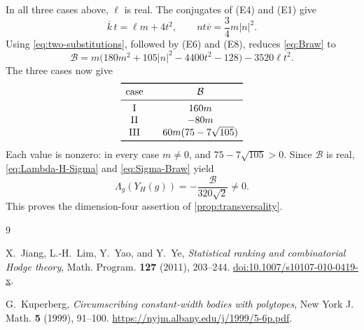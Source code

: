 \documentclass[11pt,reqno]{amsart}
\theoremstyle{remark}
\newcommand{\abs}[1]{\left\lvert #1\right\rvert}
\begin{document}
In all three cases above, $\ell$ is real.  The conjugates of (E4) and (E1)
give
\begin{equation}\label{eq:two-substitutions}
\overline k\,t=\ell m+4t^2,
\qquad
nt\overline v=\frac34m\abs n^2.
\end{equation}
Using \eqref{eq:two-substitutions}, followed by (E6) and (E8), reduces
\eqref{eq:Braw} to
\begin{equation}\label{eq:B-simplified}
\mathcal B
=m\bigl(180m^2+105\abs n^2-4400t^2-128\bigr)
-3520\ell t^2.
\end{equation}
The three cases now give
\begin{equation}\label{eq:B-values}
\begin{array}{c@{\qquad}c}
\toprule
\text{case}&\mathcal B\\
\midrule
\mathrm{I}&160m\\
\mathrm{II}&-80m\\
\mathrm{III}&60m(75-7\sqrt{105})\\
\bottomrule
\end{array}
\end{equation}
Each value is nonzero: in every case $m\ne0$, and
$75-7\sqrt{105}>0$.  Since $\mathcal B$ is real,
\eqref{eq:Lambda-H-Sigma} and \eqref{eq:Sigma-Braw} yield
\[
\Lambda_g(Y_H(g))=-\frac{\mathcal B}{320\sqrt2}\ne0.
\]
This proves the dimension-four assertion of
\cref{prop:transversality}.

\begin{thebibliography}{9}

X.~Jiang, L.-H.~Lim, Y.~Yao, and Y.~Ye,
\emph{Statistical ranking and combinatorial Hodge theory},
Math. Program. \textbf{127} (2011), 203--244.
\href{https://doi.org/10.1007/s10107-010-0419-x}{doi:10.1007/s10107-010-0419-x}.

G.~Kuperberg,
\emph{Circumscribing constant-width bodies with polytopes},
New York J. Math. \textbf{5} (1999), 91--100.
\url{https://nyjm.albany.edu/j/1999/5-6p.pdf}.

\end{thebibliography}
\end{document}
